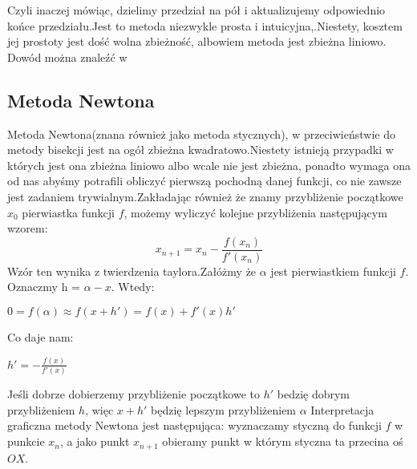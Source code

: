 \documentclass[11pt,wide]{article}
\begin{document}
\begin{algorithmic}
	\EndIf
	\Else
	\EndIf
\EndWhile
\end{algorithmic}

Czyli inaczej mówiąc, dzielimy przedział na pół i aktualizujemy odpowiednio końce przedziału.Jest to metoda niezwykle prosta i intuicyjna,.Niestety, kosztem jej prostoty jest dość wolna zbieżność, albowiem metoda jest zbieżna liniowo. Dowód można znaleźć w \cite[s. 68]{kincaidcheney}

\subsection{Metoda Newtona}
Metoda Newtona(znana również jako metoda stycznych), w przeciwieństwie do metody bisekcji jest na ogół zbieżna kwadratowo.Niestety istnieją przypadki w których jest ona zbieżna liniowo albo wcale nie jest zbieżna, ponadto wymaga ona od nas abyśmy potrafili obliczyć pierwszą pochodną danej funkcji, co nie zawsze jest zadaniem trywialnym.Zakładając również że znamy przybliżenie początkowe $x_0$ pierwiastka funkcji $f$, możemy wyliczyć kolejne przybliżenia następującym wzorem:
\begin{equation}
x_{n+1} = x_n - \frac{f(x_n)}{f'(x_n)}
\end{equation}
Wzór ten wynika z twierdzenia taylora.Załóżmy że $\alpha$ jest pierwiastkiem funkcji $f$. Oznaczmy h = $\alpha - x$. Wtedy:
\begin{center}
$0 = f(\alpha) \approx f(x + h') = f(x) + f'(x)h'$
\end{center}
Co daje nam:
\begin{center}
$h' = -\frac{f(x)}{f'(x)}$
\end{center}
Jeśli dobrze dobierzemy przybliżenie początkowe to $h'$ bedzię dobrym przybliżeniem $h$, więc $x + h'$ będzię lepszym przybliżeniem $\alpha$ \newline
Interpretacja graficzna metody Newtona jest następująca: wyznaczamy styczną do funkcji $f$ w punkcie $x_n$, a jako punkt $x_{n+1}$ obieramy punkt w którym styczna ta przecina oś $OX$. \newline



\end{document}
